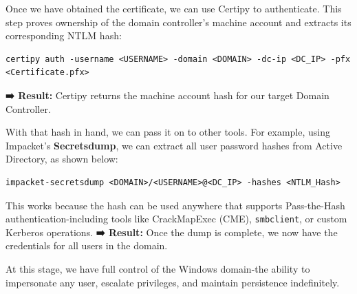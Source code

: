 Once we have obtained the certificate, we can use Certipy to authenticate. This step proves ownership of the domain controller's machine account and extracts its corresponding NTLM hash:
\begin{notebox}
\begin{verbatim}
certipy auth -username <USERNAME> -domain <DOMAIN> -dc-ip <DC_IP> -pfx <Certificate.pfx>
\end{verbatim}
\end{notebox}
\textbf{➡️ Result:} Certipy returns the machine account hash for our target Domain Controller.

With that hash in hand, we can pass it on to other tools. For example, using Impacket's \textbf{Secretsdump}, we can extract all user password hashes from Active Directory, as shown below:
\begin{notebox}
\begin{verbatim}
impacket-secretsdump <DOMAIN>/<USERNAME>@<DC_IP> -hashes <NTLM_Hash>
\end{verbatim}
\end{notebox}
This works because the hash can be used anywhere that supports Pass-the-Hash authentication-including tools like CrackMapExec (CME), \verb|smbclient|, or custom Kerberos operations.
\textbf{➡️ Result:} Once the dump is complete, we now have the credentials for all users in the domain.

At this stage, we have full control of the Windows domain-the ability to impersonate any user, escalate privileges, and maintain persistence indefinitely.

